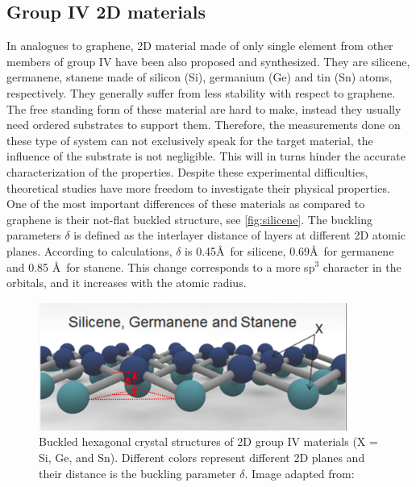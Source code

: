 \subsection{Group IV 2D materials}

In analogues to graphene, 2D material made of only single element from other members of group IV have been also proposed and synthesized. They are silicene, germanene, stanene made of silicon (Si), germanium (Ge) and tin (Sn) atoms, respectively. They generally suffer from less stability with respect to graphene. The free standing form of these material are hard to make, instead they usually need ordered substrates to support them. Therefore, the measurements done on these type of system can not exclusively speak for the target material, the influence of the substrate is not negligible\cite{Lin2013}. This will in turns hinder the accurate characterization of the properties. Despite these experimental difficulties, theoretical studies have more freedom to investigate their physical properties. One of the most important differences of these materials as compared to graphene is their not-flat buckled structure, see \autoref{fig:silicene}. The buckling parameters $\delta$ is defined as the interlayer distance of layers at different 2D atomic planes. According to calculations, $\delta$ is 0.45\AA~for silicene, 0.69\AA~for germanene and 0.85 \AA~for stanene\cite{matthes2013}. This change corresponds to a more sp$^3$ character in the orbitals, and it increases with the atomic radius. 

\begin{figure}[htbp!] 
\centering  
\includegraphics[width=0.9\textwidth]{silicene_structure.png}
\caption{Buckled hexagonal crystal structures of 2D group IV materials (X = Si, Ge, and Sn). Different colors represent different 2D planes and their distance is the buckling parameter $\delta$. Image adapted from:\cite{Balendhran2015}}  
\label{fig:silicene}
\end{figure} 


